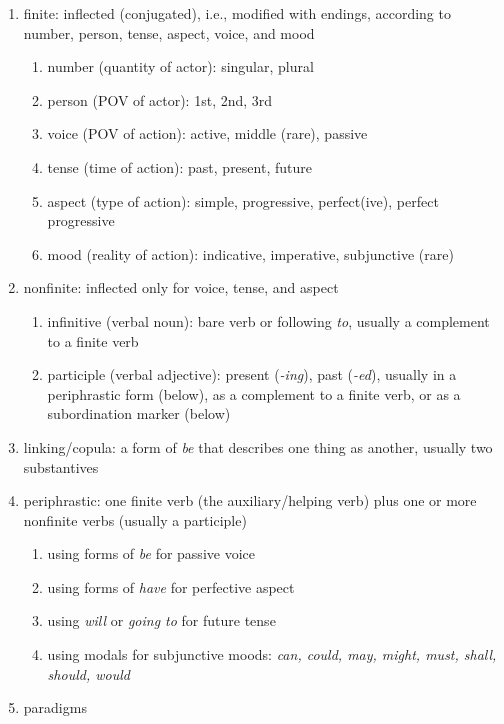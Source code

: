 \documentclass[12pt]{article}
\begin{document}
\begin{enumerate}
\item finite: inflected (conjugated), i.e., modified with endings, according to number, person, tense, aspect, voice, and mood
    \begin{enumerate}
        \item number (quantity of actor): singular, plural
        \item person (POV of actor): 1st, 2nd, 3rd
        \item voice (POV of action): active, middle (rare), passive
        \item tense (time of action): past, present, future
        \item aspect (type of action): simple, progressive, perfect(ive), perfect progressive
        \item mood (reality of action): indicative, imperative, subjunctive (rare)
    \end{enumerate}
\item nonfinite: inflected only for voice, tense, and aspect
    \begin{enumerate}
        \item infinitive (verbal noun): bare verb or following \textit{to}, usually  a complement to a finite verb
        \item participle (verbal adjective): present (\textit{-ing}), past (\textit{-ed}), usually in a periphrastic form (below), as a complement to a finite verb, or as a subordination marker (below)
    \end{enumerate}
\item linking/copula: a form of \textit{be} that describes one thing as another, usually two substantives
\item periphrastic: one finite verb (the auxiliary/helping verb) plus one or more nonfinite verbs (usually a participle)
    \begin{enumerate}
    \item using forms of \textit{be} for passive voice
    \item using forms of \textit{have} for perfective aspect
    \item using \textit{will} or \textit{going to} for future tense
    \item using modals for subjunctive moods: \textit{can, could, may, might, must, shall, should, would}
    \end{enumerate}
\item paradigms
  
\end{enumerate}
\end{document}
